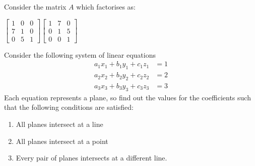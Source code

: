 \documentclass[solution,addpoints,12pt]{exam}
\begin{document}
\begin{questions}
\question[1 \half] 
Consider the matrix $A$ which factorises as:

$\begin{bmatrix}
1 & 0 & 0\\
7 & 1 & 0\\
0 & 5 & 1
\end{bmatrix}
\begin{bmatrix}
1 & 7 & 0\\
0 & 1 & 5\\
0 & 0 & 1
\end{bmatrix}$





\question[1 \half] 
Consider the following system of linear equations 
\begin{align*}
    a_1x_1 + b_1y_1 + c_1z_1 & = 1\\
    a_2x_2 + b_2y_2 + c_2z_2 & = 2\\
    a_3x_3 + b_3y_3 + c_3z_3 & = 3
\end{align*}
Each equation represents a plane, so find out the values for the coefficients such that the following conditions are satisfied:\\
\begin{enumerate}
    \item All planes intersect at a line
    \item All planes intersect at a point
    \item Every pair of planes intersects at a different line.
\end{enumerate}
\begin{solution}


\end{solution}
\end{questions}
\end{document}
